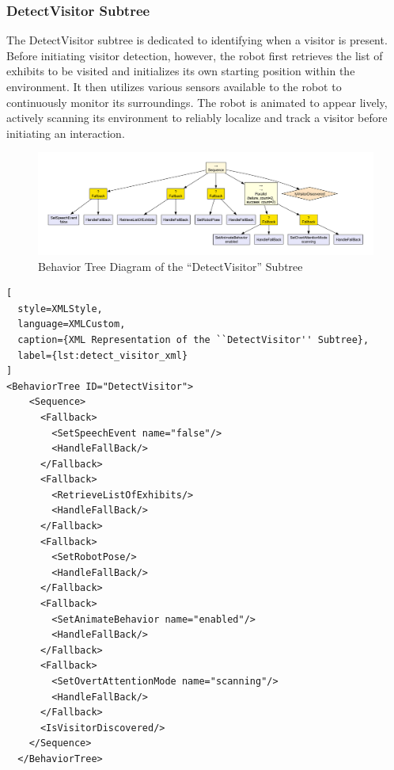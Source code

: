 \documentclass{CSSRforAfrica}
\begin{document}
 
\subsubsection{DetectVisitor Subtree}

The DetectVisitor subtree is dedicated to identifying when a visitor is present. Before initiating visitor detection, however, the robot first retrieves the list of exhibits to be visited and initializes its own starting position within the environment. It then utilizes various sensors available to the robot to continuously monitor its surroundings. The robot is animated to appear lively, actively scanning its environment to reliably localize and track a visitor before initiating an interaction. 

\begin{landscape}
\hspace{3cm}
\vspace{3cm}
\begin{figure}[H]
  \centering
  \includegraphics[width=1.55\textwidth]{./diagrams/detect.pdf}
  \caption{Behavior Tree Diagram of the ``DetectVisitor'' Subtree}
  \label{fig:detect_visitor_diagram}
\end{figure}
\end{landscape}

\begin{lstlisting}[
  style=XMLStyle, 
  language=XMLCustom, 
  caption={XML Representation of the ``DetectVisitor'' Subtree},
  label={lst:detect_visitor_xml}
]
<BehaviorTree ID="DetectVisitor">
    <Sequence>
      <Fallback>
        <SetSpeechEvent name="false"/>
        <HandleFallBack/>
      </Fallback>
      <Fallback>
        <RetrieveListOfExhibits/>
        <HandleFallBack/>
      </Fallback>
      <Fallback>
        <SetRobotPose/>
        <HandleFallBack/>
      </Fallback>
      <Fallback>
        <SetAnimateBehavior name="enabled"/>
        <HandleFallBack/>
      </Fallback>
      <Fallback>
        <SetOvertAttentionMode name="scanning"/>
        <HandleFallBack/>
      </Fallback>
      <IsVisitorDiscovered/>
    </Sequence>
  </BehaviorTree>
\end{lstlisting}
\end{document}
